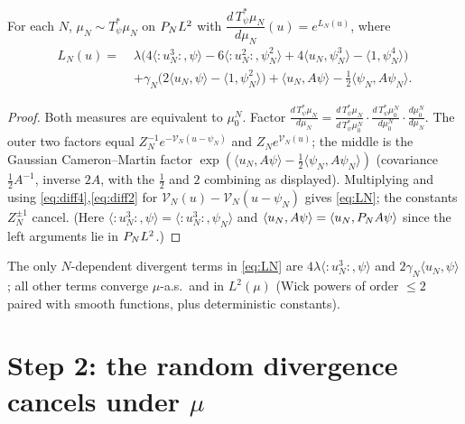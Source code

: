 \begin{qonelemma}\label{lem:density}
For each $N$, $\mu_N\sim T_\psi^*\mu_N$ on $P_N L^2$ with
$\dfrac{d\,T_\psi^*\mu_N}{d\mu_N}(u)=e^{L_N(u)}$, where
\begin{equation}\label{eq:LN}
\begin{aligned}
L_N(u)=\;&\lambda\bigl(4\langle{:}u_N^3{:},\psi\rangle-6\langle{:}u_N^2{:},\psi_N^2\rangle+4\langle u_N,\psi_N^3\rangle-\langle1,\psi_N^4\rangle\bigr)\\
&+\gamma_N\bigl(2\langle u_N,\psi\rangle-\langle1,\psi_N^2\rangle\bigr)+\langle u_N,A\psi\rangle-\tfrac12\langle\psi_N,A\psi_N\rangle .
\end{aligned}
\end{equation}
\end{qonelemma}
\begin{proof}
Both measures are equivalent to $\mu_0^N$. Factor
$\frac{d\,T_\psi^*\mu_N}{d\mu_N}=\frac{d\,T_\psi^*\mu_N}{d\,T_\psi^*\mu_0^N}\cdot\frac{d\,T_\psi^*\mu_0^N}{d\mu_0^N}\cdot\frac{d\mu_0^N}{d\mu_N}$.
The outer two factors equal $Z_N^{-1}e^{-\mathcal V_N(u-\psi_N)}$ and
$Z_Ne^{\mathcal V_N(u)}$; the middle is the Gaussian Cameron--Martin factor
$\exp(\langle u_N,A\psi\rangle-\tfrac12\langle\psi_N,A\psi_N\rangle)$ (covariance
$\tfrac12A^{-1}$, inverse $2A$, with the $\tfrac12$ and $2$ combining as displayed).
Multiplying and using \eqref{eq:diff4},\eqref{eq:diff2} for
$\mathcal V_N(u)-\mathcal V_N(u-\psi_N)$ gives \eqref{eq:LN}; the constants $Z_N^{\pm1}$
cancel. (Here $\langle{:}u_N^3{:},\psi\rangle=\langle{:}u_N^3{:},\psi_N\rangle$ and
$\langle u_N,A\psi\rangle=\langle u_N,P_N A\psi\rangle$ since the left arguments lie
in $P_N L^2$.)
\end{proof}

The only $N$-dependent divergent terms in \eqref{eq:LN} are
$4\lambda\langle{:}u_N^3{:},\psi\rangle$ and $2\gamma_N\langle u_N,\psi\rangle$; all
other terms converge $\mu$-a.s.\ and in $L^2(\mu)$ (Wick powers of order $\le2$ paired
with smooth functions, plus deterministic constants).

\section*{Step 2: the random divergence cancels under $\mu$}

